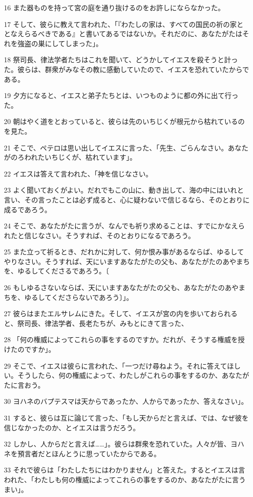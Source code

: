 \par 16 また器ものを持って宮の庭を通り抜けるのをお許しにならなかった。
\par 17 そして、彼らに教えて言われた、「『わたしの家は、すべての国民の祈の家ととなえらるべきである』と書いてあるではないか。それだのに、あなたがたはそれを強盗の巣にしてしまった」。
\par 18 祭司長、律法学者たちはこれを聞いて、どうかしてイエスを殺そうと計った。彼らは、群衆がみなその教に感動していたので、イエスを恐れていたからである。
\par 19 夕方になると、イエスと弟子たちとは、いつものように都の外に出て行った。
\par 20 朝はやく道をとおっていると、彼らは先のいちじくが根元から枯れているのを見た。
\par 21 そこで、ペテロは思い出してイエスに言った、「先生、ごらんなさい。あなたがのろわれたいちじくが、枯れています」。
\par 22 イエスは答えて言われた、「神を信じなさい。
\par 23 よく聞いておくがよい。だれでもこの山に、動き出して、海の中にはいれと言い、その言ったことは必ず成ると、心に疑わないで信じるなら、そのとおりに成るであろう。
\par 24 そこで、あなたがたに言うが、なんでも祈り求めることは、すでにかなえられたと信じなさい。そうすれば、そのとおりになるであろう。
\par 25 また立って祈るとき、だれかに対して、何か恨み事があるならば、ゆるしてやりなさい。そうすれば、天にいますあなたがたの父も、あなたがたのあやまちを、ゆるしてくださるであろう。〔
\par 26 もしゆるさないならば、天にいますあなたがたの父も、あなたがたのあやまちを、ゆるしてくださらないであろう〕」。
\par 27 彼らはまたエルサレムにきた。そして、イエスが宮の内を歩いておられると、祭司長、律法学者、長老たちが、みもとにきて言った、
\par 28 「何の権威によってこれらの事をするのですか。だれが、そうする権威を授けたのですか」。
\par 29 そこで、イエスは彼らに言われた、「一つだけ尋ねよう。それに答えてほしい。そうしたら、何の権威によって、わたしがこれらの事をするのか、あなたがたに言おう。
\par 30 ヨハネのバプテスマは天からであったか、人からであったか、答えなさい」。
\par 31 すると、彼らは互に論じて言った、「もし天からだと言えば、では、なぜ彼を信じなかったのか、とイエスは言うだろう。
\par 32 しかし、人からだと言えば……」。彼らは群衆を恐れていた。人々が皆、ヨハネを預言者だとほんとうに思っていたからである。
\par 33 それで彼らは「わたしたちにはわかりません」と答えた。するとイエスは言われた、「わたしも何の権威によってこれらの事をするのか、あなたがたに言うまい」。


